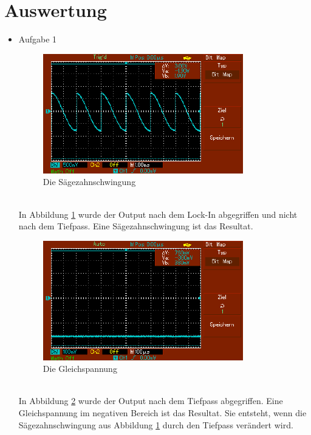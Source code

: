 \documentclass[captions=tableheading]{scrartcl}
\begin{document}
\section{Auswertung}
    \begin{itemize}
        \item{Aufgabe 1 \\}
            \begin{figure}
                \centering
                \includegraphics{Lock_In Bilder/Aufgabe 1/MAP001.pdf}
                \caption{Die Sägezahnschwingung}
                \label{fig:sawsig}
            \end{figure}
            \\
            In Abbildung \ref{fig:sawsig} wurde der Output nach dem Lock-In abgegriffen und nicht nach dem Tiefpass.
            Eine Sägezahnschwingung ist das Resultat. 
            \\
            \begin{figure}
                \centering
                \includegraphics{Lock_In Bilder/Aufgabe 1/MAP002.pdf}
                \caption{Die Gleichspannung}
                \label{fig:flatsig}
            \end{figure}
            \\
            In Abbildung \ref{fig:flatsig} wurde der Output nach dem Tiefpass abgegriffen.
            Eine Gleichspannung im negativen Bereich ist das Resultat.
            Sie entsteht, wenn die Sägezahnschwingung aus Abbildung \ref{fig:sawsig} durch den Tiefpass verändert wird.

\end{itemize}
\end{document}
